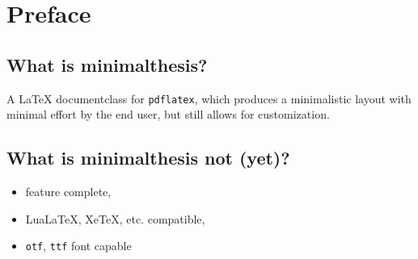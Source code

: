 \documentclass{./class/minimalthesis}
\begin{document}
	

	\mtGenerateTOC
	
	\chapter{Preface}
		\section{What is minimalthesis?}
			A LaTeX documentclass for \verb|pdflatex|, which produces a minimalistic layout with minimal effort by the end user, but still allows for customization.
		
		\section{What is minimalthesis not (yet)?}
			\begin{itemize}
				\item feature complete,
				\item Lua\LaTeX, Xe\TeX, etc. compatible,
				\item \verb|otf|, \verb|ttf| font capable
			\end{itemize}
			
	
	
	
	
	
	
	\mtGenerateBibliography
\end{document}
